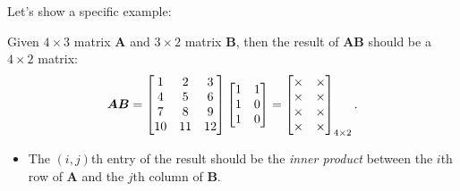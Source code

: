 Let’s show a specific example:
\begin{example}
Given $4\times 3$ matrix $\bm A$ and $3\times 2$ matrix $\bm B$, then the result of $\bm{AB}$ should be a $4\times 2$ matrix:
\[
\bm{AB}=\begin{bmatrix}
1&2&3\\4&5&6\\7&8&9\\10&11&12
\end{bmatrix}\begin{bmatrix}
1&1\\1&0\\1&0
\end{bmatrix}=\begin{bmatrix}
\times&\times\\\times&\times\\\times&\times\\\times&\times
\end{bmatrix}_{4\times 2}.
\]
\begin{itemize}
\item
The $(i,j)$th entry of the result should be the \emph{inner product} between the $i$th row of $\bm A$ and the $j$th
column of $\bm B$. 


\end{itemize}
\end{example}
